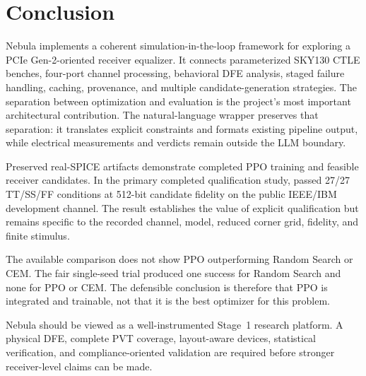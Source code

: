 \chapter{Conclusion}

Nebula implements a coherent simulation-in-the-loop framework for exploring a
PCIe Gen-2-oriented receiver equalizer. It connects parameterized SKY130 CTLE
benches, four-port channel processing, behavioral DFE analysis, staged failure
handling, caching, provenance, and multiple candidate-generation strategies.
The separation between optimization and evaluation is the project's most
important architectural contribution. The natural-language wrapper preserves
that separation: it translates explicit constraints and formats existing
pipeline output, while electrical measurements and verdicts remain outside the
LLM boundary.

Preserved real-SPICE artifacts demonstrate completed PPO training and feasible
receiver candidates. In the primary completed qualification study,
 passed 27/27 TT/SS/FF conditions at 512-bit candidate
fidelity on the public IEEE/IBM development channel. The result establishes the
value of explicit qualification but remains specific to the recorded channel,
model, reduced corner grid, fidelity, and finite stimulus.

The available comparison does not show PPO outperforming Random Search or CEM.
The fair single-seed trial produced one success for Random Search and none for
PPO or CEM. The defensible conclusion is therefore that PPO is integrated and
trainable, not that it is the best optimizer for this problem.

Nebula should be viewed as a well-instrumented Stage~1 research platform. A
physical DFE, complete PVT coverage, layout-aware devices, statistical
verification, and compliance-oriented validation are required before stronger
receiver-level claims can be made.
